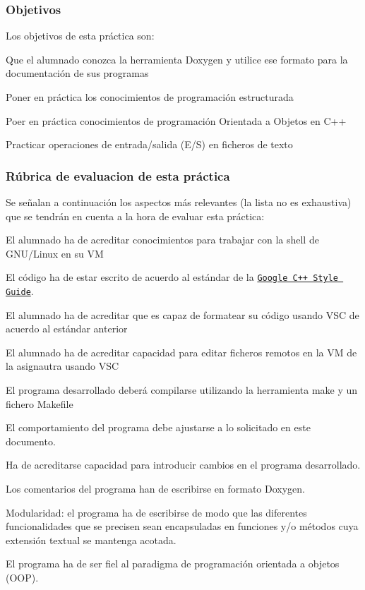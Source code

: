 \subsubsection*{Objetivos}

Los objetivos de esta práctica son\+:


\begin{DoxyItemize}
\item Que el alumnado conozca la herramienta Doxygen y utilice ese formato para la documentación de sus programas
\item Poner en práctica los conocimientos de programación estructurada
\item Poer en práctica conocimientos de programación Orientada a Objetos en C++
\item Practicar operaciones de entrada/salida (E/S) en ficheros de texto
\end{DoxyItemize}

\subsubsection*{Rúbrica de evaluacion de esta práctica}

Se señalan a continuación los aspectos más relevantes (la lista no es exhaustiva) que se tendrán en cuenta a la hora de evaluar esta práctica\+:


\begin{DoxyItemize}
\item El alumnado ha de acreditar conocimientos para trabajar con la shell de G\+N\+U/\+Linux en su VM
\item El código ha de estar escrito de acuerdo al estándar de la \href{https://google.github.io/styleguide/cppguide.html}{\tt Google C++ Style Guide}.
\item El alumnado ha de acreditar que es capaz de formatear su código usando V\+SC de acuerdo al estándar anterior
\item El alumnado ha de acreditar capacidad para editar ficheros remotos en la VM de la asignautra usando V\+SC
\item El programa desarrollado deberá compilarse utilizando la herramienta {\ttfamily make} y un fichero {\ttfamily Makefile}
\item El comportamiento del programa debe ajustarse a lo solicitado en este documento.
\item Ha de acreditarse capacidad para introducir cambios en el programa desarrollado.
\item Los comentarios del programa han de escribirse en formato Doxygen.
\item Modularidad\+: el programa ha de escribirse de modo que las diferentes funcionalidades que se precisen sean encapsuladas en funciones y/o métodos cuya extensión textual se mantenga acotada.
\item El programa ha de ser fiel al paradigma de programación orientada a objetos (O\+OP).
\end{DoxyItemize}

